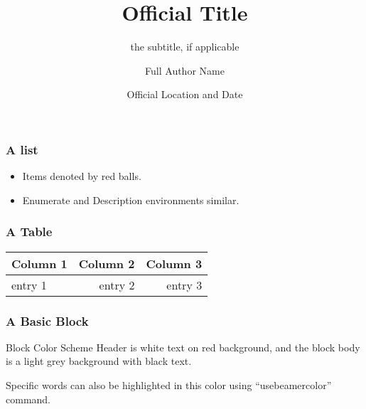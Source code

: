 \documentclass{beamer}
\title[short title]{Official Title}
\subtitle{the subtitle, if applicable}
\author[short author]{Full Author Name}
\institute[RHIT]{}
\date[short date]{Official Location and Date}
\begin{document}
\titlepg





\begin{frame}
  \frametitle{A list}
  \begin{itemize}
    \item Items denoted by red balls.
    \item Enumerate and Description environments similar.
  \end{itemize}
\end{frame}

\begin{frame}
	\frametitle{A Table}
	\begin{center}
		\begin{tabular}{lrr}\toprule
			Column 1 & Column 2 & Column 3 \\ \midrule
			entry 1 & entry 2 & entry 3 \\ \bottomrule
		\end{tabular}
	\end{center}
\end{frame}




\begin{frame}
  \frametitle{A Basic Block}
  \begin{block}{Block Color Scheme}
    Header is white text on red background, and the block body is a light grey
    background with black text.
  \end{block}
  
  { Specific words} can also be highlighted 
  in this color using ``usebeamercolor'' command.
\end{frame}
\end{document}
